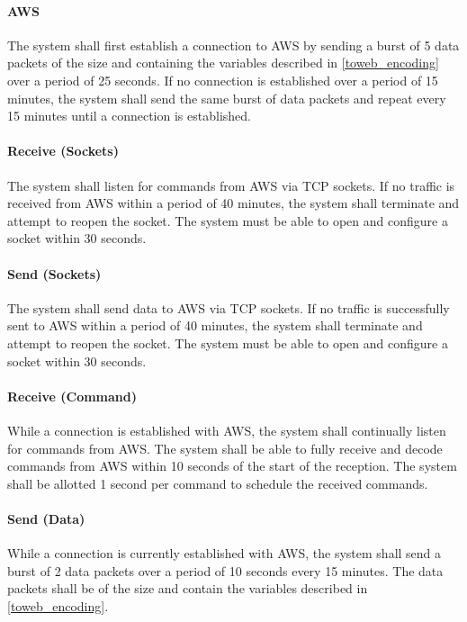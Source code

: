 \paragraph{AWS} The system shall first establish a connection to AWS by sending a burst of 5 data packets of the size and containing the variables described in \autoref{toweb_encoding} over a period of 25 seconds. If no connection is established over a period of 15 minutes, the system shall send the same burst of data packets and repeat every 15 minutes until a connection is established.

\paragraph{Receive (Sockets)} The system shall listen for commands from AWS via TCP sockets. If no traffic is received from AWS within a period of 40 minutes, the system shall terminate and attempt to reopen the socket. The system must be able to open and configure a socket within 30 seconds.

\paragraph{Send (Sockets)} The system shall send data to AWS via TCP sockets. If no traffic is successfully sent to AWS within a period of 40 minutes, the system shall terminate and attempt to reopen the socket. The system must be able to open and configure a socket within 30 seconds.

\paragraph{Receive (Command)} While a connection is established with AWS, the system shall continually listen for commands from AWS. The system shall be able to fully receive and decode commands from AWS within 10 seconds of the start of the reception. The system shall be allotted 1 second per command to schedule the received commands.

\paragraph{Send (Data)} While a connection is currently established with AWS, the system shall send a burst of 2 data packets over a period of 10 seconds every 15 minutes. The data packets shall be of the size and contain the variables described in \autoref{toweb_encoding}.


